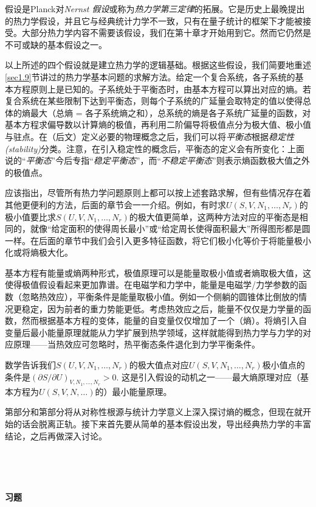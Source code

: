 假设\uppercase\expandafter{}是Planck对{\it Nernst 假设}或称为{\it 热力学第三定律}的拓展。它是历史上最晚提出的热力学假设，并且它与经典统计力学不一致，只有在量子统计的框架下才能被接受。大部分热力学内容不需要该假设，我们在第十章才开始用到它。然而它仍然是不可或缺的基本假设之一。

以上所述的四个假设就是建立热力学的逻辑基础。根据这些假设，我们简要地重述\ref{sec1.9}节讲过的热力学基本问题的求解方法。给定一个复合系统，各子系统的基本方程原则上是已知的。子系统处于平衡态时，由基本方程可以算出对应的熵。若复合系统在某些限制下达到平衡态，则每个子系统的广延量会取特定的值以使得总体的熵最大（总熵 = 各子系统熵之和），总系统的熵是各子系统广延量的函数，对基本方程求偏导数以计算熵的极值，再利用二阶偏导将极值点分为极大值、极小值与驻点。在（后文）定义必要的物理概念之后，我们可以将{\it 平衡态}根据{\it 稳定性 (stability)}分类。注意，在引入稳定性的概念后，平衡态的定义会有所变化：上面说的“{\it 平衡态}”今后专指“{\it 稳定平衡态}”，而“{\it 不稳定平衡态}”则表示熵函数极大值之外的极值点。

应该指出，尽管所有热力学问题原则上都可以按上述套路求解，但有些情况存在着其他更便利的方法，后面的章节会一一介绍。例如，有时求$U(S, V, N_1, \dots, N_r)$的极小值要比求$S(U, V, N_1, \dots, N_r)$的极大值更简单，这两种方法对应的平衡态是相同的，就像“给定面积的使得周长最小”或“给定周长使得面积最大”所得图形都是圆一样。在后面的章节中我们会引入更多特征函数，将它们极小化等价于将能量极小化或将熵极大化。

基本方程有能量或熵两种形式，极值原理可以是能量取极小值或者熵取极大值，这使得极值假设看起来更加靠谱。在电磁学和力学中，能量是电磁学/力学参数的函数（忽略热效应），平衡条件是能量取极小值。例如一个侧躺的圆锥体比倒放的情况更稳定，因为前者的重力势能更低。考虑热效应之后，能量不仅仅是力学量的函数，然而根据基本方程的变体，能量的自变量仅仅增加了一个（熵）。将熵引入自变量后最小能量原理就能从力学扩展到热学领域，这样就能得到热力学与力学的对应原理——当热效应可忽略时，热平衡态条件退化到力学平衡条件。

数学告诉我们$S(U, V, N_1, \dots, N_r)$的极大值点对应$U(S, V, N_1, \dots, N_r)$极小值点的条件是$(\partial S/\partial U)_{V, N_1, \dots, N_r} > 0$. 这是引入假设\uppercase\expandafter{}的动机之一——最大熵原理对应（基本方程为$U(S, V, N, \dots)$的）最小能量原理。

第\uppercase\expandafter{}部分和第\uppercase\expandafter{}部分将从对称性根源与统计力学意义上深入探讨熵的概念，但现在就开始的话会脱离正轨。接下来首先要从简单的基本假设出发，导出经典热力学的丰富结论，之后再做深入讨论。

\ 

\ 

{\bf \Large 习题}
\ 

